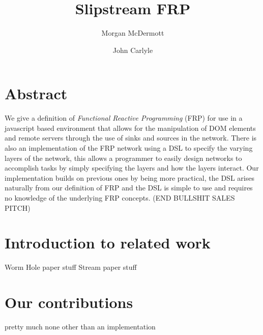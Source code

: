 \documentclass[twocolumn]{paper}
\title{Slipstream FRP}
\author[*]{Morgan McDermott}
\author[**]{John Carlyle}
\affil[*]{University of flightless dragons}
\affil[**]{University of angry bees}
\begin{document}
\maketitle
\section{Abstract}
We give a definition of \textit{Functional Reactive Programming} (FRP) for use in a javascript based environment that allows for the manipulation of DOM elements and remote servers through the use of sinks and sources in the network. There is also an implementation of the FRP network using a DSL to specify the varying layers of the network, this allows a programmer to easily design networks to accomplish tasks by simply specifying the layers and how the layers interact. Our implementation builds on previous ones by being more practical, the DSL arises naturally from our definition of FRP and the DSL is simple to use and requires no knowledge of the underlying FRP concepts. (END BULLSHIT SALES PITCH)

\section{Introduction to related work}
Worm Hole paper stuff
Stream paper stuff

\section{Our contributions}
pretty much none other than an implementation
\end{document}
